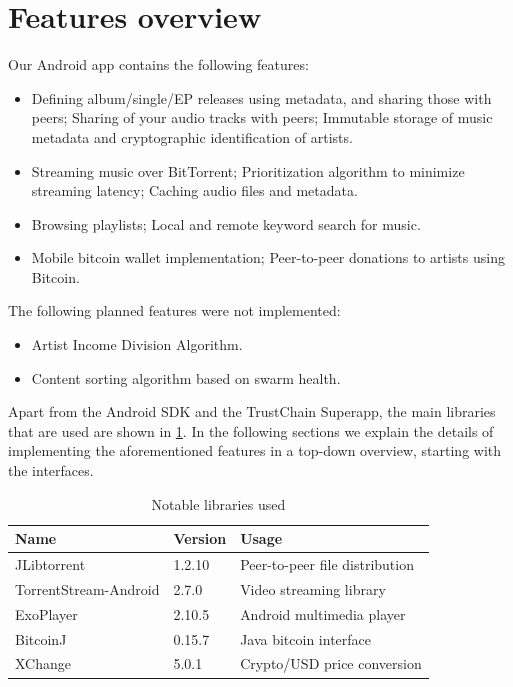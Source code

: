 \section{Features overview}
Our Android app contains the following features:
\begin{itemize}
    \item Defining album/single/EP releases using metadata, and sharing those with peers; Sharing of your audio tracks with peers; Immutable storage of music metadata and cryptographic identification of artists.
    \item Streaming music over BitTorrent; Prioritization algorithm to minimize streaming latency; Caching audio files and metadata.
    \item Browsing playlists; Local and remote keyword search for music.
    \item Mobile bitcoin wallet implementation; Peer-to-peer donations to artists using Bitcoin.
\end{itemize}
The following planned features were not implemented:
\begin{itemize}
    \item Artist Income Division Algorithm.
    \item Content sorting algorithm based on swarm health.
\end{itemize}
Apart from the Android SDK and the TrustChain Superapp, the main libraries that are used are shown in \ref{tab:library-usage}. In the following sections we explain the details of implementing the aforementioned features in a top-down overview, starting with the interfaces.

\begin{table}[]
\begin{tabular}{|l|l|l|}
\hline
Name                  & Version & Usage                          \\ \hline
JLibtorrent           & 1.2.10  & Peer-to-peer file distribution \\ \hline
TorrentStream-Android & 2.7.0   & Video streaming library        \\ \hline
ExoPlayer             & 2.10.5  & Android multimedia player      \\ \hline
BitcoinJ              & 0.15.7  & Java bitcoin interface         \\ \hline
XChange               & 5.0.1   & Crypto/USD price conversion    \\ \hline
\end{tabular}
\caption{Notable libraries used}
\label{tab:library-usage}
\end{table}

